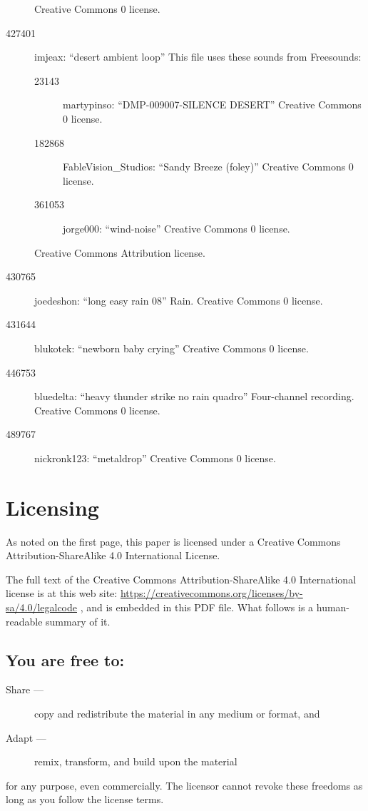 \documentclass[letterpaper,twoside]{article}
\begin{document}
\begin{description}
  Creative Commons 0 license.
\item[427401]imjeax: ``desert ambient loop''
This file uses these sounds from Freesounds:
\begin{description}
\item[23143]martypinso: ``DMP-009007-SILENCE DESERT''
  Creative Commons 0 license.
\item[182868]FableVision\_Studios: ``Sandy Breeze (foley)''
  Creative Commons 0 license.
\item [361053]jorge000: ``wind-noise''
  Creative Commons 0 license.
\end{description}
Creative Commons Attribution license.
\item[430765]joedeshon: ``long easy rain 08''
  Rain.  Creative Commons 0 license.
\item[431644]blukotek: ``newborn baby crying''
  Creative Commons 0 license.
\item[446753]bluedelta: ``heavy thunder strike no rain quadro''
  Four-channel recording.  Creative Commons 0 license.
\item[489767]nickronk123: ``metaldrop''
  Creative Commons 0 license.
\end{description}

\newpage

\section{Licensing}
\label{section:Licensing}
As noted on the first page, this paper is licensed under a Creative
Commons Attribution-ShareAlike 4.0 International License.

The full text of the Creative Commons Attribution-ShareAlike 4.0
International license is at this web site:
\url{https://creativecommons.org/licenses/by-sa/4.0/legalcode}%
, and is embedded in this
PDF file.  What follows is a human-readable summary of it.

\subsection{You are free to:}
\begin{description}
\item[Share ---]copy and redistribute the material in any medium or format, and
\item[Adapt ---]remix, transform, and build upon the material
\end{description}
for any purpose, even commercially.  The licensor cannot revoke these
freedoms as long as you follow the license terms.
\end{document}
